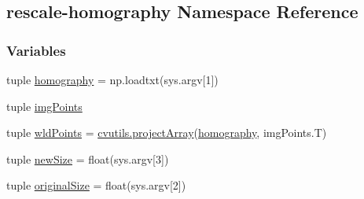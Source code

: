 \hypertarget{namespacerescale-homography}{\subsection{rescale-\/homography Namespace Reference}
\label{namespacerescale-homography}
}
\subsubsection*{Variables}
\begin{DoxyCompactItemize}
\item 
tuple \hyperlink{namespacerescale-homography_a42ffc42ab732245a1523d5a509bb8b1a}{homography} = np.\-loadtxt(sys.\-argv\mbox{[}1\mbox{]})
\item 
tuple \hyperlink{namespacerescale-homography_a75e8d0f1b7d28d78d256c46c4bf6ce55}{img\-Points}
\item 
tuple \hyperlink{namespacerescale-homography_a1405968f6adcb1ca05fb4f1601d5a884}{wld\-Points} = \hyperlink{namespacecvutils_a0ec21be4fe1491cec23252672d90564c}{cvutils.\-project\-Array}(\hyperlink{namespacerescale-homography_a42ffc42ab732245a1523d5a509bb8b1a}{homography}, img\-Points.\-T)
\item 
tuple \hyperlink{namespacerescale-homography_a67c44d251f65d66939ff6006bfaa3d51}{new\-Size} = float(sys.\-argv\mbox{[}3\mbox{]})
\item 
tuple \hyperlink{namespacerescale-homography_a0e5471c7a35e44f5da24c0384591940b}{original\-Size} = float(sys.\-argv\mbox{[}2\mbox{]})
\end{DoxyCompactItemize}


